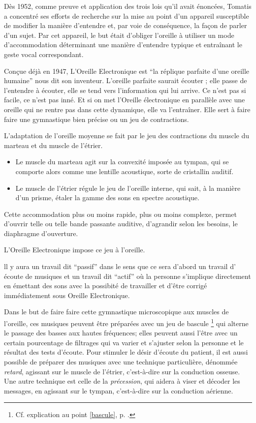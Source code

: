 Dès 1952, comme preuve et application des trois lois qu'il avait énoncées,
Tomatis a concentré ses efforts de recherche sur la mise au point
d'un appareil susceptible de modifier la manière d'entendre et, par
voie de conséquence, la façon de parler d'un sujet. Par cet appareil,
le but était d'obliger l'oreille à utiliser un mode d'accommodation
déterminant une manière d'entendre typique et entraînant le geste
vocal correspondant.

Conçue déjà en 1947, L'Oreille Electronique est ``la réplique parfaite
d'une oreille humaine'' nous dit son inventeur. L'oreille parfaite
saurait écouter ; elle passe de l'entendre à écouter, elle se tend
vers l'information qui lui arrive. Ce n'est pas si facile, ce n'est
pas inné. Et si on met l'Oreille électronique en parallèle avec une
oreille qui ne rentre pas dans cette dynamique, elle va l'entraîner.
Elle sert à faire faire une gymnastique bien précise ou un jeu de
contractions.

L'adaptation de l'oreille moyenne se fait par le jeu des contractions
du muscle du marteau et du muscle de l'étrier.
\begin{itemize}
\item Le muscle du marteau agit sur la convexité imposée au tympan, qui
se comporte alors comme une lentille acoustique, sorte de cristallin
auditif.
\item Le muscle de l'étrier régule le jeu de l'oreille interne, qui sait,
à la manière d'un prisme, étaler la gamme des sons en spectre acoustique.
\end{itemize}
Cette accommodation plus ou moins rapide, plus ou moins complexe, permet
d'ouvrir telle ou telle bande passante auditive, d'agrandir selon
les besoins, le diaphragme d'ouverture.

L'Oreille Electronique impose ce jeu à l'oreille.

ll y aura un travail dit ``passif'' dans le sens que ce sera d'abord
un travail d' écoute de musiques et un travail dit ``actif'' où
la personne s'implique directement en émettant des sons avec la possibité
de travailler et d'être corrigé immédiatement sous Oreille Electronique.

Dans le but de faire faire cette gymnastique microscopique aux muscles
de l'oreille, ces musiques peuvent être préparées avec un jeu de bascule%
\footnote{Cf. explication au point \ref{bascule}, p. \pageref{bascule}.} 
qui alterne le passage des basses aux hautes
fréquences; elles peuvent aussi l'être avec un certain pourcentage
de filtrages qui va varier et s'ajuster selon la personne
et le résultat des tests d'écoute. Pour stimuler le désir d'écoute
du patient, il est aussi possible de préparer des musiques avec une
technique particulière, dénommée \emph{retard}, agissant sur le muscle de
l'étrier, c'est-à-dire sur la conduction osseuse. Une autre technique
est celle de la \emph{précession}, qui aidera à viser et décoder les messages,
en agissant sur le tympan, c'est-à-dire sur la conduction aérienne. 


